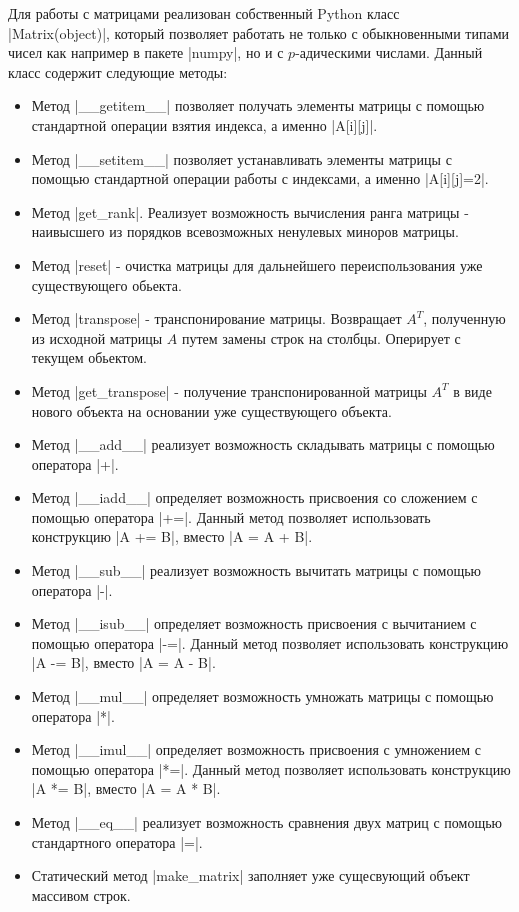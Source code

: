 \documentclass[master, och, diploma, times]{sty/SCWorks}
\theoremstyle{plain}
\theoremstyle{definition}
\begin{document}
Для работы с матрицами реализован собственный Python класс \\ |Matrix(object)|, который позволяет работать не только с обыкновенными типами чисел как например в пакете |numpy|, но и с $p$-адическими числами. Данный класс содержит следующие методы:
\begin{itemize}
\item Метод |__getitem__| позволяет получать элементы матрицы с помощью стандартной операции взятия индекса, а именно |A[i][j]|.
\item Метод |__setitem__| позволяет устанавливать элементы матрицы с помощью стандартной операции работы с индексами, а именно |A[i][j]=2|.
\item Метод |get_rank|. Реализует возможность вычисления ранга матрицы - наивысшего из порядков всевозможных ненулевых миноров матрицы.
\item Метод |reset| - очистка матрицы для дальнейшего переиспользования уже существующего обьекта.
\item Метод |transpose| - транспонирование матрицы. Возвращает $A^{T}$, полученную из исходной матрицы $A$ путем замены строк на столбцы. Оперирует с текущем обьектом.
\item Метод |get_transpose| - получение транспонированной матрицы $A^{T}$ в виде нового объекта на основании уже существующего объекта.
\item Метод |__add__| реализует возможность складывать матрицы с помощью оператора |+|.
\item Метод |__iadd__| определяет возможность присвоения со сложением с помощью оператора |+=|. Данный метод позволяет использовать конструкцию |A += B|, вместо |A = A + B|.
\item Метод |__sub__| реализует возможность вычитать матрицы с помощью оператора |-|.
\item Метод |__isub__| определяет возможность присвоения с вычитанием с помощью оператора |-=|. Данный метод позволяет использовать конструкцию |A -= B|, вместо |A = A - B|.
\item Метод |__mul__| определяет возможность умножать матрицы с помощью оператора |*|.
\item Метод |__imul__| определяет возможность присвоения с умножением с помощью оператора |*=|. Данный метод позволяет использовать конструкцию |A *= B|, вместо |A = A * B|.
\item Метод |__eq__| реализует возможность сравнения двух матриц с помощью стандартного оператора |=|.
\item Статический метод |make_matrix| заполняет уже сущесвующий объект массивом строк.

\end{itemize}
\end{document}
